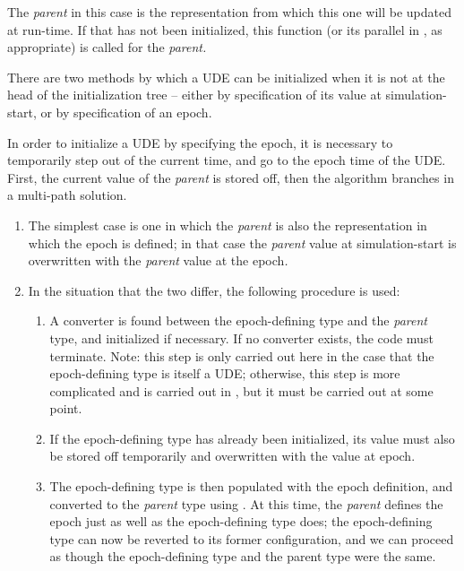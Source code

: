 {\begin{enumerate}
{\begin{enumerate}
The \textit{parent} in this case is the representation from which this
one will be updated at run-time.  If that has not been initialized,
this function (or its parallel in , as
appropriate) is called for the \textit{parent.}




There are two methods by which a UDE can be initialized when it is not
at the head of the initialization tree -- either by specification of
its value at simulation-start, or by specification of an epoch.




In order to initialize a UDE by specifying the epoch, it is necessary to
temporarily step out of the current time, and go to the epoch time of
the UDE.  First, the current value of the \textit{parent} is stored
off, then the algorithm branches in a multi-path solution.





\begin{enumerate}
\item The simplest case is one in which the \textit{parent} is also the
representation in which the epoch is defined; in that case the
\textit{parent} value at simulation-start is overwritten with the
\textit{parent }value at the epoch\textit{.}


\item In the situation that the two differ, the following procedure is used:

\begin{enumerate}
\item A converter is found between the epoch-defining type and the
\textit{parent }type, and initialized if necessary.  If no converter
exists, the code must terminate.  Note: this step is only carried out
here in the case that the epoch-defining type is itself a UDE;
otherwise, this step is more complicated and is carried out in
, 
but it must be carried out at some
point.
\item If the epoch-defining type has already been initialized, its value
must also be stored off temporarily and overwritten with the value at
epoch.
\item  The epoch-defining type is then populated with the epoch
definition, and converted to the \textit{parent }type using
.  
At this time, the \textit{parent}
defines the epoch just as well as the epoch-defining type does; the
epoch-defining type can now be reverted to its former configuration,
and we can proceed as though the epoch-defining type and the parent
type were the same.
\end{enumerate}
\end{enumerate}




\end{enumerate}}
\end{enumerate}}
